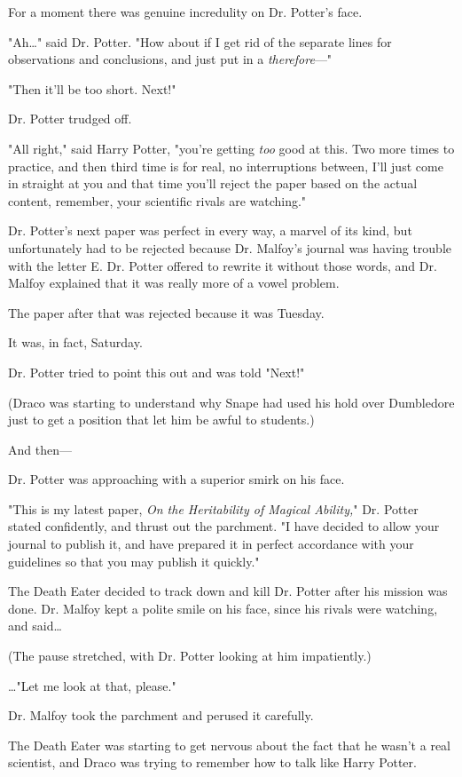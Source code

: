 For a moment there was genuine incredulity on Dr. Potter's face.

"Ah{\ldots}" said Dr. Potter. "How about if I get rid of the separate lines for 
observations and conclusions, and just put in a \emph{therefore}---"

"Then it'll be too short. Next!"

Dr. Potter trudged off.

"All right," said Harry Potter, "you're getting \emph{too} good at this. Two 
more times to practice, and then third time is for real, no interruptions 
between, I'll just come in straight at you and that time you'll reject the 
paper based on the actual content, remember, your scientific rivals are 
watching."

Dr. Potter's next paper was perfect in every way, a marvel of its kind, but 
unfortunately had to be rejected because Dr. Malfoy's journal was having 
trouble with the letter E. Dr. Potter offered to rewrite it without those 
words, and Dr. Malfoy explained that it was really more of a vowel problem.

The paper after that was rejected because it was Tuesday.

It was, in fact, Saturday.

Dr. Potter tried to point this out and was told "Next!"

(Draco was starting to understand why Snape had used his hold over Dumbledore 
just to get a position that let him be awful to students.)

And then---

Dr. Potter was approaching with a superior smirk on his face.

"This is my latest paper, \emph{On the Heritability of Magical Ability,}" Dr. 
Potter stated confidently, and thrust out the parchment. "I have decided to 
allow your journal to publish it, and have prepared it in perfect accordance 
with your guidelines so that you may publish it quickly."

The Death Eater decided to track down and kill Dr. Potter after his mission was 
done. Dr. Malfoy kept a polite smile on his face, since his rivals were 
watching, and said{\ldots}

(The pause stretched, with Dr. Potter looking at him impatiently.)

{\ldots}"Let me look at that, please."

Dr. Malfoy took the parchment and perused it carefully.

The Death Eater was starting to get nervous about the fact that he wasn't a 
real scientist, and Draco was trying to remember how to talk like Harry Potter.

